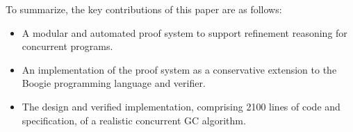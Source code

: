 To summarize, the key contributions of this paper are as follows:
\begin{itemize}
\item 
A modular and automated proof system to support refinement reasoning for concurrent programs.
\item 
An implementation of the proof system as a conservative extension to the Boogie programming language and verifier.
\item 
The design and verified implementation, comprising 2100 lines of code and specification, of a realistic concurrent GC algorithm.
\end{itemize}



